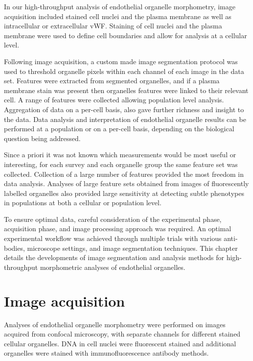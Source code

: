 In our high-throughput analysis of endothelial organelle morphometry, image acquisition included stained cell nuclei and the plasma membrane as well as intracellular or extracellular vWF. Staining of cell nuclei and the plasma membrane were used to define cell boundaries and allow for analysis at a cellular level.

Following image acquisition, a custom made image segmentation protocol was used to threshold organelle pixels within each channel of each image in the data set. Features were extracted from segmented organelles, and if a plasma membrane stain was present then organelles features were linked to their relevant cell. A range of features were collected allowing population level analysis. Aggregation of data on a per-cell basis, also gave further richness and insight to the data. Data analysis and interpretation of endothelial organelle results can be performed at a population or on a per-cell basis, depending on the biological question being addressed.

Since a priori it was not known which measurements would be most useful or interesting, for each survey and each organelle group the same feature set was collected. Collection of a large number of features provided the most freedom in data analysis. Analyses of large feature sets obtained from images of fluorescently labelled organelles also provided large sensitivity at detecting subtle phenotypes in populations at both a cellular or population level.

To ensure optimal data, careful consideration of the experimental phase, acquisition phase, and image processing approach was required. An optimal experimental workflow was achieved through multiple trials with various anti-bodies, microscope settings, and image segmentation techniques. This chapter details the developments of image segmentation and analysis methods for high-throughput morphometric analyses of endothelial organelles.

\section{Image acquisition}
\label{endothelial_morphometry:image_acquisition}
Analyses of endothelial organelle morphometry were performed on images acquired from confocal microscopy, with separate channels for different stained cellular organelles. DNA in cell nuclei were fluorescent stained and additional organelles were stained with immunofluorescence antibody methods.

